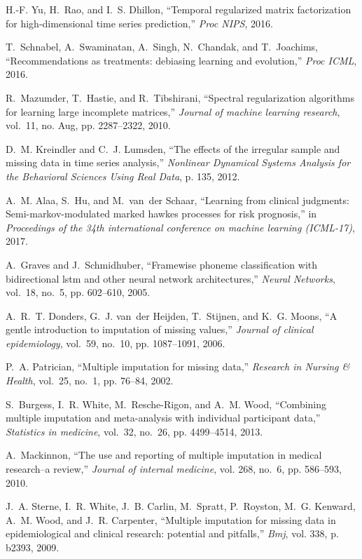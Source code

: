 \documentclass{article}
\begin{document}
\begin{thebibliography}{10}
	H.-F. Yu, H.~Rao, and I.~S. Dhillon, ``Temporal regularized matrix
	factorization for high-dimensional time series prediction,'' \emph{Proc
		NIPS}, 2016.
	
	T.~Schnabel, A.~Swaminatan, A.~Singh, N.~Chandak, and T.~Joachims,
	``Recommendations as treatments: debiasing learning and evolution,''
	\emph{Proc ICML}, 2016.
	
	R.~Mazumder, T.~Hastie, and R.~Tibshirani, ``Spectral regularization algorithms
	for learning large incomplete matrices,'' \emph{Journal of machine learning
		research}, vol.~11, no. Aug, pp. 2287--2322, 2010.
	
	D.~M. Kreindler and C.~J. Lumsden, ``The effects of the irregular sample and
	missing data in time series analysis,'' \emph{Nonlinear Dynamical Systems
		Analysis for the Behavioral Sciences Using Real Data}, p. 135, 2012.
	
	A.~M. Alaa, S.~Hu, and M.~van~der Schaar, ``Learning from clinical judgments:
	Semi-markov-modulated marked hawkes processes for risk prognosis,'' in
	\emph{Proceedings of the 34th international conference on machine learning
		(ICML-17)}, 2017.
	
	A.~Graves and J.~Schmidhuber, ``Framewise phoneme classification with
	bidirectional lstm and other neural network architectures,'' \emph{Neural
		Networks}, vol.~18, no.~5, pp. 602--610, 2005.
	
	A.~R.~T. Donders, G.~J. van~der Heijden, T.~Stijnen, and K.~G. Moons, ``A
	gentle introduction to imputation of missing values,'' \emph{Journal of
		clinical epidemiology}, vol.~59, no.~10, pp. 1087--1091, 2006.
	
	P.~A. Patrician, ``Multiple imputation for missing data,'' \emph{Research in
		Nursing \& Health}, vol.~25, no.~1, pp. 76--84, 2002.
	
	S.~Burgess, I.~R. White, M.~Resche-Rigon, and A.~M. Wood, ``Combining multiple
	imputation and meta-analysis with individual participant data,''
	\emph{Statistics in medicine}, vol.~32, no.~26, pp. 4499--4514, 2013.
	
	A.~Mackinnon, ``The use and reporting of multiple imputation in medical
	research--a review,'' \emph{Journal of internal medicine}, vol. 268, no.~6,
	pp. 586--593, 2010.
	
	J.~A. Sterne, I.~R. White, J.~B. Carlin, M.~Spratt, P.~Royston, M.~G. Kenward,
	A.~M. Wood, and J.~R. Carpenter, ``Multiple imputation for missing data in
	epidemiological and clinical research: potential and pitfalls,'' \emph{Bmj},
	vol. 338, p. b2393, 2009.
	

\end{thebibliography}
\end{document}
